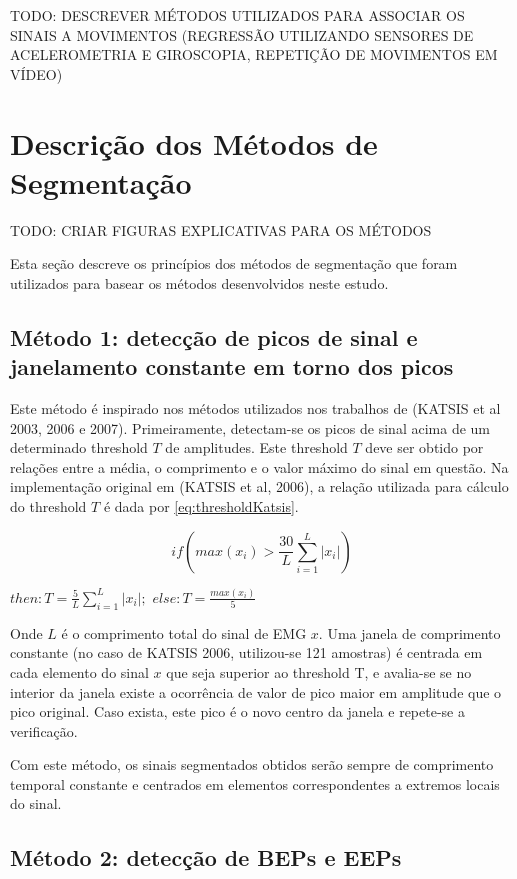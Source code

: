 \documentclass[
	12pt,				%
	openright,			%
	oneside,
	a4paper,			%
	english,			%
	francais,				%
	spanish,			%
	brazil				%
	]{abntex2}
\begin{document}
TODO: DESCREVER MÉTODOS UTILIZADOS PARA ASSOCIAR OS SINAIS A MOVIMENTOS (REGRESSÃO UTILIZANDO SENSORES DE ACELEROMETRIA E GIROSCOPIA, REPETIÇÃO DE MOVIMENTOS EM VÍDEO)

\section{Descrição dos Métodos de Segmentação}
 
TODO: CRIAR FIGURAS EXPLICATIVAS PARA OS MÉTODOS

	Esta seção descreve os princípios dos métodos de segmentação que foram utilizados para basear os métodos desenvolvidos neste estudo.
 
\subsection{Método 1: detecção de picos de sinal e janelamento constante em torno dos picos}

	Este método é inspirado nos métodos utilizados nos trabalhos de (KATSIS et al 2003, 2006 e 2007). Primeiramente, detectam-se os picos de sinal acima de um determinado threshold $T$ de amplitudes. Este threshold $T$ deve ser obtido por relações entre a média, o comprimento e o valor máximo do sinal em questão. Na implementação original em (KATSIS et al, 2006), a relação utilizada para cálculo do threshold $T$ é dada por \ref{eq:thresholdKatsis}.

\begin{equation}
\label{eq:thresholdKatsis}
  if\left(max(x_i) > \frac{30}{L}\sum_{i=1}^{L}|x_i|\right)
\end{equation}
\begin{center}
$then: T = \frac{5}{L}\sum_{i=1}^{L}|x_i|;$
$else: T = \frac{max(x_i)}{5}$
\end{center}

	Onde $L$ é o comprimento total do sinal de EMG $x$. Uma janela de comprimento constante (no caso de KATSIS 2006, utilizou-se 121 amostras) é centrada em cada elemento do sinal $x$ que seja superior ao threshold T, e avalia-se se no interior da janela existe a ocorrência de valor de pico maior em amplitude que o pico original. Caso exista, este pico é o novo centro da janela e repete-se a verificação.

	Com este método, os sinais segmentados obtidos serão sempre de comprimento temporal constante e centrados em elementos correspondentes a extremos locais do sinal.

\subsection{Método 2: detecção de BEPs e EEPs}
\end{document}
